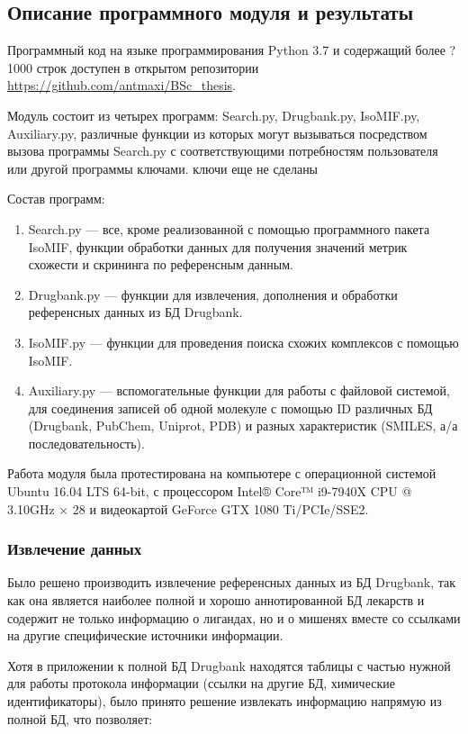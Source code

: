 \documentclass[a4paper,14pt]{article}         %
\newcommand{\sic}[1]{\LARGE\color{orange}{#1}\color{black}\Large}
\begin{document}
\subsection{Описание программного модуля и результаты}
Программный код на языке программирования Python 3.7 \cite{python37} и содержащий более ?1000 строк доступен в открытом репозитории \linebreak \href{https://github.com/antmaxi/BSc\_thesis}{https://github.com/antmaxi/BSc\_thesis}.

Модуль состоит из четырех программ: Search.py, Drugbank.py, IsoMIF.py, Auxiliary.py, различные функции из которых могут вызываться посредством вызова программы Search.py с соответствующими потребностям пользователя или другой программы ключами. \color{orange} ключи еще не сделаны \color{black}

Состав программ:
\begin{enumerate}
	\item Search.py --- все, кроме реализованной с помощью программного пакета IsoMIF, функции обработки данных для получения значений метрик схожести и скрининга по референсным данным.
	\item Drugbank.py --- функции для извлечения, дополнения и обработки референсных данных из БД Drugbank.
	\item IsoMIF.py --- функции для проведения поиска схожих комплексов с помощью IsoMIF.
	\item Auxiliary.py --- вспомогательные функции для работы с файловой системой, для соединения записей об одной молекуле с помощью ID различных БД (Drugbank, PubChem, Uniprot, PDB) и разных характеристик (SMILES, а/а последовательность).
\end{enumerate}

Работа модуля была протестирована на компьютере с операционной системой Ubuntu 16.04 LTS 64-bit, с процессором Intel® Core™ i9-7940X CPU @ 3.10GHz $\times$ 28 и видеокартой GeForce GTX 1080 Ti/PCIe/SSE2.
\subsubsection{Извлечение данных}
Было решено производить извлечение референсных данных из БД Drugbank, так как она является наиболее полной и хорошо аннотированной БД лекарств \sic{cite{}} и содержит не только информацию о лигандах, но и о мишенях вместе со ссылками на другие специфические источники информации. 

Хотя в приложении к полной БД Drugbank находятся таблицы с частью нужной для работы протокола информации (ссылки на другие БД, химические идентификаторы), было принято решение извлекать информацию напрямую из полной БД, что позволяет: 
\end{document}
